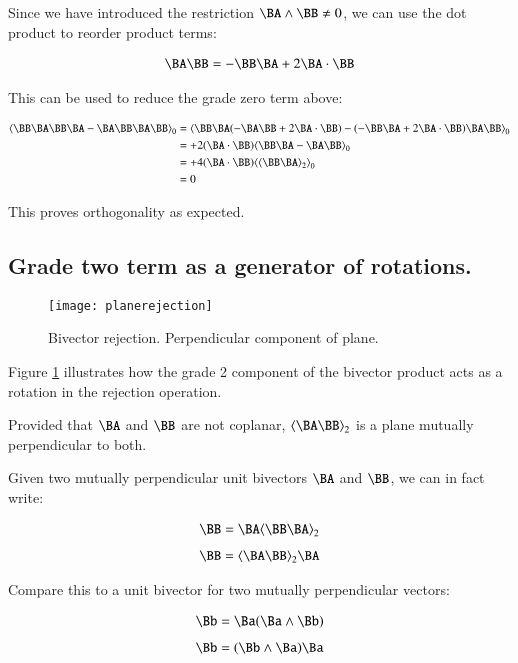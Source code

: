 Since we have introduced the restriction $\BA \wedge \BB \ne 0$, we can use the dot product to reorder product terms:

\begin{align*}
\BA\BB = -\BB\BA + 2 \BA \cdot \BB
\end{align*}

This can be used to reduce the grade zero term above:

\begin{align*}
\gpgradezero{ \BB\BA\BB\BA -\BA\BB\BA\BB }
&= \gpgradezero{ \BB\BA(-\BA\BB + 2 \BA \cdot \BB) -(-\BB\BA + 2 \BA \cdot \BB)\BA\BB } \\
&= + 2 (\BA \cdot \BB)\gpgradezero{\BB\BA - \BA\BB } \\
&= + 4 (\BA \cdot \BB)\gpgradezero{\gpgradetwo{\BB\BA}} \\
&= 0 \\
\end{align*}

This proves orthogonality as expected.

\subsection{Grade two term as a generator of rotations. }

\begin{figure}[htp]
\centering
\texttt{[image: planerejection]}
\caption{Bivector rejection.  Perpendicular component of plane.}\label{fig:planerejection}
\end{figure}

Figure \ref{fig:planerejection} illustrates how the grade 2 component of the bivector product acts as a rotation in the rejection operation.

Provided that $\BA$ and $\BB$ are not coplanar, $\gpgradetwo{\BA\BB}$ is a plane mutually perpendicular to both.

Given two mutually perpendicular unit bivectors ${\BA}$ and ${\BB}$, we can in fact write: 

\begin{align*}
{\BB} = {\BA}\gpgradetwo{{\BB}{\BA}}
\end{align*}
\begin{align*}
{\BB} = \gpgradetwo{{\BA}{\BB}}{\BA}
\end{align*}

Compare this to a unit bivector for two mutually perpendicular vectors:

\begin{align*}
\Bb = \Ba (\Ba \wedge \Bb)
\end{align*}
\begin{align*}
\Bb = (\Bb \wedge \Ba) \Ba
\end{align*}

